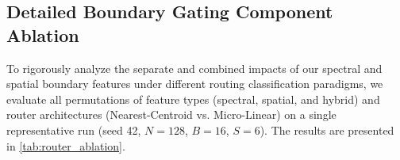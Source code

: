 \documentclass{article}
\theoremstyle{plain}
\theoremstyle{definition}
\theoremstyle{remark}
\begin{document}
\subsection{Detailed Boundary Gating Component Ablation}
To rigorously analyze the separate and combined impacts of our spectral and spatial boundary features under different routing classification paradigms, we evaluate all permutations of feature types (spectral, spatial, and hybrid) and router architectures (Nearest-Centroid vs. Micro-Linear) on a single representative run (seed 42, $N=128$, $B=16$, $S=6$). The results are presented in \cref{tab:router_ablation}.

\begin{table}[t]
\caption{Ablation of boundary gating feature and router types on ResNet-18 ($N=128$). NC and Linear denote Nearest-Centroid and Micro-Linear classifiers. Accuracies are reported as routing success rates (\%).}
\label{tab:router_ablation}
\begin{center}
\begin{small}
\end{small}
\end{center}
\end{table}
\end{document}
